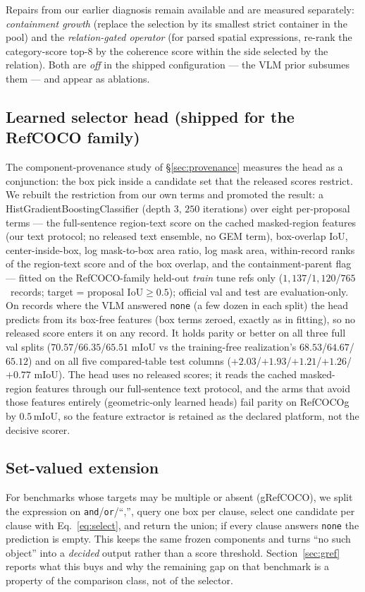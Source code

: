 Repairs from our earlier diagnosis remain available and are measured
separately: \emph{containment growth} (replace the selection by its smallest
strict container in the pool) and the \emph{relation-gated operator} (for
parsed spatial expressions, re-rank the category-score top-$8$ by the
coherence score within the side selected by the relation). Both are
\emph{off} in the shipped configuration --- the VLM prior subsumes them ---
and appear as ablations.

\subsection{Learned selector head (shipped for the RefCOCO family)}
\label{sec:head}
The component-provenance study of \S\ref{sec:provenance} measures the head as
a conjunction: the box pick inside a candidate set that the released scores
restrict. We rebuilt the restriction from our own terms and promoted the
result: a HistGradientBoostingClassifier (depth $3$, $250$ iterations) over
eight per-proposal terms --- the full-sentence region-text score on the cached
masked-region features (our text protocol; no released text ensemble, no GEM
term), box-overlap IoU, center-inside-box, log mask-to-box area ratio, log
mask area, within-record ranks of the region-text score and of the box
overlap, and the containment-parent flag --- fitted on the RefCOCO-family
held-out \emph{train} tune refs only (\mbox{$1{,}137$/$1{,}120$/$765$
records}; target = proposal $\mathrm{IoU}\ge0.5$); official val and test are
evaluation-only. On records where the VLM answered \texttt{none} (a few dozen
in each split) the head predicts from its box-free features (box terms zeroed,
exactly as in fitting), so no released score enters it on any record. It holds
parity or better on all three full val splits
($70.57$/$66.35$/$65.51$ mIoU vs the training-free realization's
$68.53$/$64.67$/$65.12$) and on all five compared-table test columns
($+2.03$/$+1.93$/$+1.21$/$+1.26$/$+0.77$ mIoU). The head uses no released
scores; it reads the cached masked-region features through our full-sentence
text protocol, and the arms that avoid those features entirely (geometric-only
learned heads) fail parity on RefCOCOg by $0.5$\,mIoU, so the feature
extractor is retained as the declared platform, not the decisive scorer.

\subsection{Set-valued extension}
\label{sec:setvalued}
For benchmarks whose targets may be multiple or absent (gRefCOCO), we split
the expression on \texttt{and}/\texttt{or}/``,'', query one box per clause,
select one candidate per clause with Eq.~\ref{eq:select}, and return the
union; if every clause answers \texttt{none} the prediction is empty. This
keeps the same frozen components and turns ``no such object'' into a
\emph{decided} output rather than a score threshold. Section~\ref{sec:gref}
reports what this buys and why the remaining gap on that benchmark is a
property of the comparison class, not of the selector.

